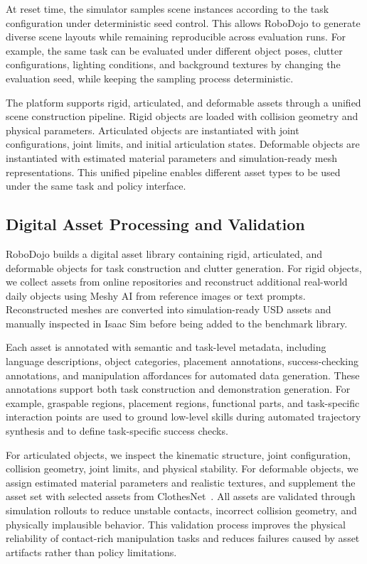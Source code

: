At reset time, the simulator samples scene instances according to the task configuration under deterministic seed control. This allows RoboDojo to generate diverse scene layouts while remaining reproducible across evaluation runs. For example, the same task can be evaluated under different object poses, clutter configurations, lighting conditions, and background textures by changing the evaluation seed, while keeping the sampling process deterministic.

The platform supports rigid, articulated, and deformable assets through a unified scene construction pipeline. Rigid objects are loaded with collision geometry and physical parameters. Articulated objects are instantiated with joint configurations, joint limits, and initial articulation states. Deformable objects are instantiated with estimated material parameters and simulation-ready mesh representations. This unified pipeline enables different asset types to be used under the same task and policy interface.

\subsection{Digital Asset Processing and Validation}
\label{appendix:asset_library_details}

RoboDojo builds a digital asset library containing rigid, articulated, and deformable objects for task construction and clutter generation. For rigid objects, we collect assets from online repositories and reconstruct additional real-world daily objects using Meshy AI from reference images or text prompts. Reconstructed meshes are converted into simulation-ready USD assets and manually inspected in Isaac Sim before being added to the benchmark library.

Each asset is annotated with semantic and task-level metadata, including language descriptions, object categories, placement annotations, success-checking annotations, and manipulation affordances for automated data generation. These annotations support both task construction and demonstration generation. For example, graspable regions, placement regions, functional parts, and task-specific interaction points are used to ground low-level skills during automated trajectory synthesis and to define task-specific success checks.

For articulated objects, we inspect the kinematic structure, joint configuration, collision geometry, joint limits, and physical stability. For deformable objects, we assign estimated material parameters and realistic textures, and supplement the asset set with selected assets from ClothesNet~\citep{zhou2023clothesnet}. All assets are validated through simulation rollouts to reduce unstable contacts, incorrect collision geometry, and physically implausible behavior. This validation process improves the physical reliability of contact-rich manipulation tasks and reduces failures caused by asset artifacts rather than policy limitations.


